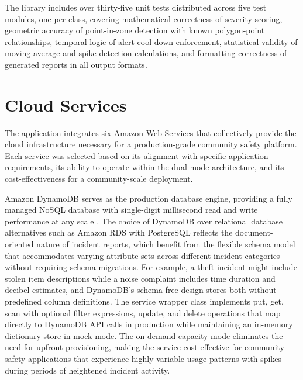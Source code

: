 \documentclass[conference]{IEEEtran}
\begin{document}
The library includes over thirty-five unit tests distributed across five test modules, one per class, covering mathematical correctness of severity scoring, geometric accuracy of point-in-zone detection with known polygon-point relationships, temporal logic of alert cool-down enforcement, statistical validity of moving average and spike detection calculations, and formatting correctness of generated reports in all output formats.

\section{Cloud Services}

The application integrates six Amazon Web Services that collectively provide the cloud infrastructure necessary for a production-grade community safety platform. Each service was selected based on its alignment with specific application requirements, its ability to operate within the dual-mode architecture, and its cost-effectiveness for a community-scale deployment.

Amazon DynamoDB serves as the production database engine, providing a fully managed NoSQL database with single-digit millisecond read and write performance at any scale \cite{decandia2007dynamo}. The choice of DynamoDB over relational database alternatives such as Amazon RDS with PostgreSQL reflects the document-oriented nature of incident reports, which benefit from the flexible schema model that accommodates varying attribute sets across different incident categories without requiring schema migrations. For example, a theft incident might include stolen item descriptions while a noise complaint includes time duration and decibel estimates, and DynamoDB's schema-free design stores both without predefined column definitions. The service wrapper class implements put, get, scan with optional filter expressions, update, and delete operations that map directly to DynamoDB API calls in production while maintaining an in-memory dictionary store in mock mode. The on-demand capacity mode eliminates the need for upfront provisioning, making the service cost-effective for community safety applications that experience highly variable usage patterns with spikes during periods of heightened incident activity.
\end{document}

